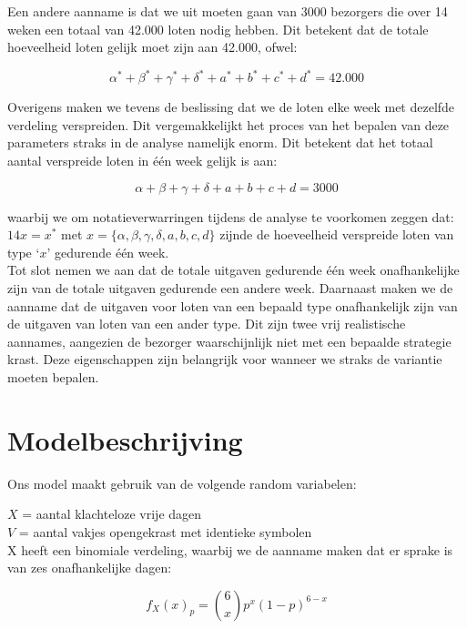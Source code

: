 Een andere aanname is dat we uit moeten gaan van 3000 bezorgers die over 14 weken een totaal van 42.000 loten nodig hebben. Dit betekent dat de totale hoeveelheid loten gelijk moet zijn aan 42.000, ofwel:

\begin{equation*}
    \alpha^{*}+\beta^{*}+\gamma^{*}+\delta^{*}+a^{*}+b^{*}+c^{*}+d^{*}=42.000
\end{equation*}

Overigens maken we tevens de beslissing dat we de loten elke week met dezelfde verdeling verspreiden. Dit vergemakkelijkt het proces van het bepalen van deze parameters straks in de analyse namelijk enorm. Dit betekent dat het totaal aantal verspreide loten in één week gelijk is aan:

\begin{equation*}
    \alpha+\beta+\gamma+\delta+a+b+c+d=3000
\end{equation*}

waarbij we om notatieverwarringen tijdens de analyse te voorkomen zeggen dat: $14x=x^{*}$ met $x=\{\alpha,\beta,\gamma,\delta,a,b,c,d\}$ zijnde de hoeveelheid verspreide loten van type `$x$' gedurende één week.\\

Tot slot nemen we aan dat de totale uitgaven gedurende één week onafhankelijke zijn van de totale uitgaven gedurende een andere week. Daarnaast maken we de aanname dat de uitgaven voor loten van een bepaald type onafhankelijk zijn van de uitgaven van loten van een ander type. Dit zijn twee vrij realistische aannames, aangezien de bezorger waarschijnlijk niet met een bepaalde strategie krast. Deze eigenschappen zijn belangrijk voor wanneer we straks de variantie moeten bepalen.

\section{Modelbeschrijving}

Ons model maakt gebruik van de volgende random variabelen:

$X$ = aantal klachteloze vrije dagen\\
$V$ = aantal vakjes opengekrast met identieke symbolen\\

X heeft een binomiale verdeling, waarbij we de aanname maken dat er sprake is van zes onafhankelijke dagen:

\begin{equation}
f_{X}(x)_{p} =\binom{6}{x} p^{x}(1-p)^{6-x}
\end{equation}

